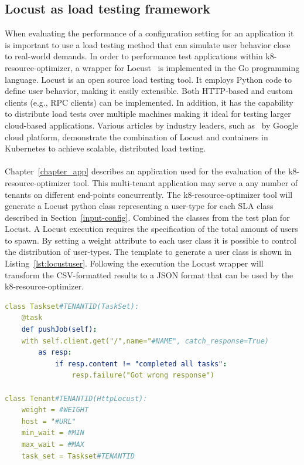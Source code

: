 \subsection{Locust as load testing framework}
\label{locust-wrapper}
When evaluating the performance of a configuration setting for an application it is important to use a load testing method that can simulate user behavior close to real-world demands. In order to performance test applications within k8-resource-optimizer, a wrapper for Locust~\cite{locust} is implemented in the Go programming language. Locust is an open source load testing tool. It employs Python code to define user behavior, making it easily extensible. Both HTTP-based and custom clients (e.g., RPC clients) can be implemented. In addition, it has the capability to distribute load tests over multiple machines making it ideal for testing larger cloud-based applications. Various articles by industry leaders, such as~\cite{locustkube} by Google cloud platform, demonstrate the combination of Locust and containers in Kubernetes to achieve scalable, distributed load testing.
\\\\
Chapter~\ref{chapter_app} describes an  application used for the evaluation of the k8-resource-optimizer tool. This multi-tenant application may serve a any number of tenants on different end-points concurrently. The k8-resource-optimizer tool will generate a Locust python class representing a user-type for each SLA class described in Section~\ref{input-config}. Combined the classes from the test plan for Locust. A Locust execution requires the specification of the total amount of users to spawn. By setting a weight attribute to each user class it is possible to control the distribution of user-types. The template to generate a user class is shown in Listing~\ref{lst:locustuser}. Following the execution the Locust wrapper will transform the CSV-formatted results to a JSON format that can be used by the k8-resource-optimizer.
\begin{lstlisting}[caption=Locust user class template., language=yaml, label={lst:locustuser}]
class Taskset#TENANTID(TaskSet):
    @task
    def pushJob(self):
    with self.client.get("/",name="#NAME", catch_response=True) 
        as resp:
            if resp.content != "completed all tasks":
                resp.failure("Got wrong response")

class Tenant#TENANTID(HttpLocust):
    weight = #WEIGHT
    host = "#URL"
    min_wait = #MIN
    max_wait = #MAX
    task_set = Taskset#TENANTID
\end{lstlisting}



